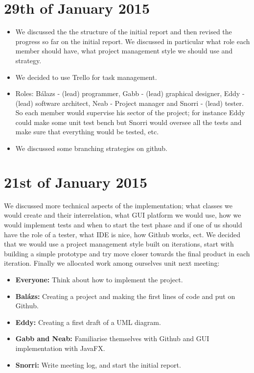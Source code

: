 \documentclass[11pt]{article}
\begin{document}
\section{29th of January 2015}
\begin{itemize}
\item We discussed the the structure of the initial report and then revised the progress so far on the initial report. We discussed in particular what role each member should have, what project management style we should use and strategy.
\item We decided to use Trello for task management.
\item Roles: Bálazs - (lead) programmer, Gabb - (lead) graphical designer, Eddy - (lead) software architect, Neab - Project manager and Snorri - (lead) tester. So each member would supervise his sector of the project; for instance Eddy could make some unit test bench but Snorri would oversee all the tests and make sure that everything would be tested, etc.
\item We discussed some branching strategies on github. 
\end{itemize} 

\newpage

\section{21st of January 2015}
We discussed more technical aspects of the implementation; what classes we would create and their interrelation, what GUI platform we would use, how we would implement tests and when to start the test phase and if one of us should have the role of a tester, what IDE is nice, how Github works, ect. We decided that we would use a project management style built on iterations, start with building a simple prototype and try move closer towards the final product in each iteration. Finally we allocated work among ourselves unit next meeting:
\begin{itemize}
\item \textbf{Everyone:} Think about how to implement the project.

\item \textbf{Balázs:} Creating a project and making the first lines of code and put on Github.

\item \textbf{Eddy:} Creating a first draft of a UML diagram.

\item \textbf{Gabb and Neab:} Familiarise themselves with Github and GUI implementation with JavaFX.

\item \textbf{Snorri:} Write meeting log, and start the initial report.

\end{itemize} 
\end{document}
